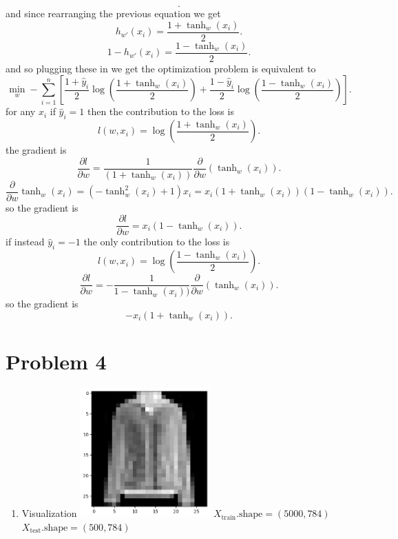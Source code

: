 \documentclass[11pt]{article}
\newcommand{\solution}[1]{{{\color{blue}{\bf Solution:} {#1}}}}
\begin{document}
{\begin{enumerate}
\[            .\] 
            and since rearranging the previous equation we get
            \[
                h_{w'}(x_i) = \frac{1 + \tanh_{w}(x_i)}{2}
            .\] 
            \[
                1 - h_{w'}(x_i) = \frac{1-\tanh_w(x_i)}{2}
            .\] 
            and so plugging these in we get the optimization problem is equivalent to
            \[
                \min_{w} - \sum_{i=1}^{n}[\frac{1+\hat y_i}{2}\log(\frac{1 + \tanh_w(x_i)}{2}) + \frac{1-\hat y_i}{2}\log( \frac{1-\tanh_w(x_i)}{2})]
            .\] 
            for any $x_i$ if $\hat y_i = 1$ then the contribution to the loss is
             \[
            l(w,x_i) = \log(\frac{1 + \tanh_w(x_i)}{2})
            .\] 
            the gradient is
            \[
                \frac{\partial l}{\partial w} = \frac{1}{(1 + \tanh_w(x_i))} \frac{\partial}{\partial w}(\tanh_w(x_i))
            .\] 
            \[
            \frac{\partial}{\partial w} \tanh_w(x_i) = (-\tanh_w^2(x_i) + 1)x_i = x_i(1+\tanh_w(x_i))(1-\tanh_w(x_i))
            .\] 
            so the gradient is
            \[
                \frac{\partial l}{\partial w} = x_i(1-\tanh_w(x_i))
            .\] 
            if instead $\hat y_i = -1$ the only contribution to the loss is
             \[
            l(w,x_i) = \log(\frac{1-\tanh_w(x_i)}{2})
            .\] 
            \[
                \frac{\partial l}{\partial w} = -\frac{1}{1- \tanh_w(x_i))} \frac{\partial}{\partial w} (\tanh_w(x_i))
            .\] 
            so the gradient is
            \[
            -x_i(1+\tanh_w(x_i))
            .\] 
    \end{enumerate}
}
\section{Problem 4}
\solution{
    \begin{enumerate}
        \item Visualization
            \includegraphics[width=5cm]{q4.png}
            $X_{\text{train}}.\text{shape} = (5000, 784)$\\
            $X_{\text{test}}.\text{shape} = (500, 784)$
    \end{enumerate}
}
\end{document}
